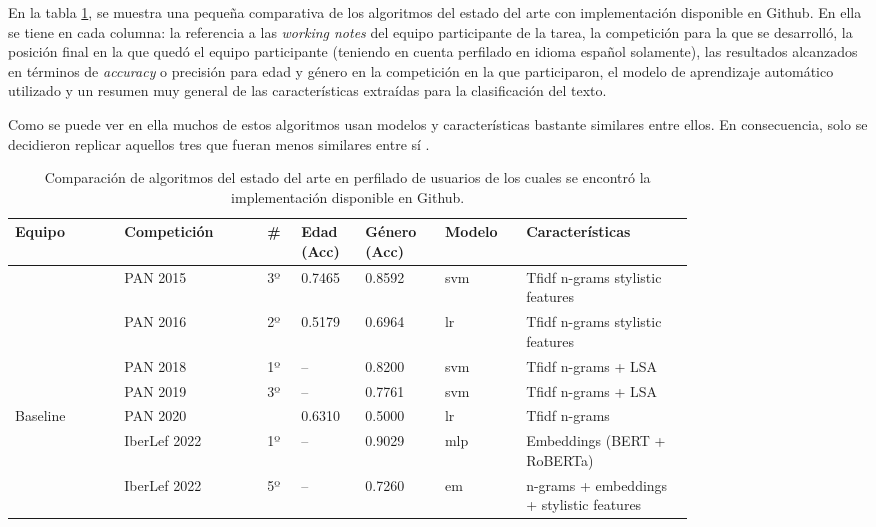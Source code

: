 En la tabla \ref{tab:comparacion-profilers}, se muestra una pequeña comparativa de los algoritmos del estado del arte con implementación disponible en Github. En ella se tiene en cada columna: la referencia a las \textit{working notes} del equipo participante de la tarea, la competición para la que se desarrolló, la posición final en la que quedó el equipo participante (teniendo en cuenta perfilado en idioma español solamente), las resultados alcanzados en términos de \textit{accuracy} o precisión para edad y género en la competición en la que participaron, el modelo de aprendizaje automático utilizado y un resumen muy general de las características extraídas para la clasificación del texto.

Como se puede ver en ella muchos de estos algoritmos usan modelos y características bastante similares entre ellos. En consecuencia, solo se decidieron replicar aquellos tres que fueran menos similares entre sí \citep{loscalis22, modaresi:2016, grivas2015author}.


\begin{table}[H]
    \centering
    {
    \setlength{\tabcolsep}{0.2\tabcolsep}
        \begin{tabular}{|p{0.13\linewidth} |p{0.17\linewidth} |p{0.04\linewidth} |p{0.07\linewidth} |p{0.09\linewidth} |p{0.09\linewidth} | p{0.2\linewidth} |}
            \hline
            \rowcolor{udcpink!25}
            
            \textbf{Equipo} & \textbf{Competición}  & \textbf{\#} & \textbf{Edad} (Acc) & \textbf{Género} (Acc) & \textbf{Modelo} & \textbf{Características}\\ \hline
            \citet{grivas2015author} & PAN 2015 \citep{pan:2015} & 3º & 0.7465 & 0.8592 & \gls{svm} & Tfidf n-grams stylistic features\\
            \citet{modaresi:2016} & PAN 2016 \citep{pan:2016} & 2º & 0.5179 & 0.6964 & \gls{lr} & Tfidf n-grams stylistic features\\
            \citet{Daneshvar2018} & PAN 2018 \citep{pan:2018} & 1º & -- & 0.8200 & \gls{svm} & Tfidf n-grams + LSA\\
            \citet{bacciu2019bot} & PAN 2019 \citep{pan:2019} & 3º & -- & 0.7761 & \gls{svm} & Tfidf n-grams + LSA\\
            Baseline & PAN 2020 \citep{pan:2020} & & 0.6310 & 0.5000 & \gls{lr} & Tfidf n-grams\\
            \citet{loscalis22} & IberLef 2022 \citep{iberlef2022} & 1º & -- & 0.9029 & \gls{mlp} & Embeddings (BERT + RoBERTa)\\
            \citet{holgado2022halbert} & IberLef 2022 \citep{iberlef2022} & 5º & -- & 0.7260 & \gls{em} & n-grams + embeddings + stylistic features\\ \hline
        \end{tabular}
    }
    \caption{Comparación de algoritmos del estado del arte en perfilado de usuarios de los cuales se encontró la implementación disponible en Github.}
    \label{tab:comparacion-profilers}
\end{table}

